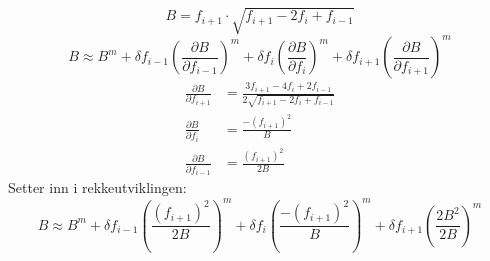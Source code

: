 \begin{equation}
  B = f_{i+1} \cdot \sqrt{f_{i+1} - 2 f_i + f_{i-1}}
\end{equation}
\begin{equation}
  B \approx B^m
  + \delta f_{i-1} \left( \frac{\partial B}{\partial f_{i-1}} \right)^m
  + \delta f_{i} \left( \frac{\partial B}{\partial f_{i}} \right)^m
  + \delta f_{i+1} \left( \frac{\partial B}{\partial f_{i+1}} \right)^m
\end{equation}
\begin{subequations}
\begin{align}
  \frac{\partial B}{\partial f_{i+1}} &= \frac{3 f_{i+1} - 4 f_{i} + 2 f_{i-1}}{2 \sqrt{f_{i+1} - 2 f_{i} + f_{i-1}}} \\
  \frac{\partial B}{\partial f_{i}}   &= \frac{-(f_{i+1})^2}{B} \\
  \frac{\partial B}{\partial f_{i-1}} &= \frac{(f_{i+1})^2}{2B}
\end{align}
\end{subequations}
Setter inn i rekkeutviklingen:
\begin{equation}
  B \approx B^m
  + \delta f_{i-1} \left( \frac{(f_{i+1})^2}{2B} \right)^m
  + \delta f_{i} \left( \frac{-(f_{i+1})^2}{B} \right)^m
  + \delta f_{i+1} \left( \frac{2B^2}{2 B} \right)^m
\end{equation}








